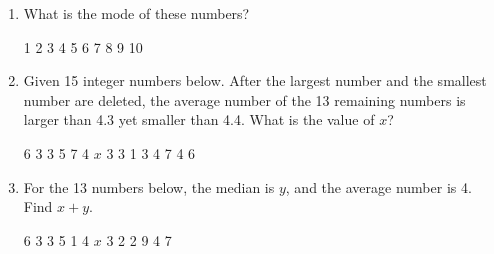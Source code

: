 \documentclass[11pt]{scrartcl}
\begin{document}
\begin{enumerate}
    \vspace{7.5cm} \item What is the mode of these numbers?
        \begin{tcolorbox}[colback=blue!10!white,colframe=blue!75!black,box align=center,
            halign=center,
            valign=center]
            1 2 3 4 5 6 7 8 9 10
        \end{tcolorbox}
    
    \vspace{7.5cm} \item Given 15 integer numbers below. After the largest number and the smallest number are deleted, the average number of the 13 remaining numbers is larger than 4.3 yet smaller than 4.4. What is the value of $x$?
        \begin{tcolorbox}[colback=green!10!white,colframe=green!75!black,box align=center,
        halign=center,
        valign=center]
        6  3  3  5  7  4  $x$  3  3  1  3  4  7  4  6
        \end{tcolorbox}

    \vspace{7.5cm} \item For the 13 numbers below, the median is $y$, and the average number is 4. Find $x+y$.   
       \begin{tcolorbox}[colback=red!10!white,colframe=red!75!black,box align=center,
        halign=center,
        valign=center]
        6 3 3 5 1 4 $x$ 3 2 2 9 4 7
        \end{tcolorbox}
\vspace{7.5cm} 
\end{enumerate}
\end{document}
